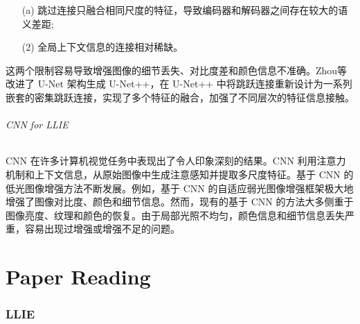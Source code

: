 \documentclass[a4paper, 10pt]{article}
\begin{document}
		\begin{itemize}
			\item[(a)] 
			跳过连接只融合相同尺度的特征，导致编码器和解码器之间存在较大的语义差距;
			
			\item[(2)]
			全局上下文信息的连接相对稀缺。
		\end{itemize}	
		
		这两个限制容易导致增强图像的细节丢失、对比度差和颜色信息不准确。Zhou等\cite{zhou2018unet++,zhou2019unet++}改进了 U-Net 架构生成 U-Net++，在 U-Net++ 中将跳跃连接重新设计为一系列嵌套的密集跳跃连接，实现了多个特征的融合，加强了不同层次的特征信息接触。

		\paragraph{CNN for LLIE}
		
		CNN 在许多计算机视觉任务中表现出了令人印象深刻的结果。CNN 利用注意力机制\cite{yang2021locally, zhang2020attention}和上下文信息，从原始图像中生成注意感知并提取多尺度特征\cite{li2018multi,zamir2020learning}。基于 CNN 的低光图像增强方法不断发展。例如，基于 CNN 的自适应弱光图像增强框架\cite{li2020visual}极大地增强了图像对比度、颜色和细节信息。然而，现有的基于 CNN 的方法大多侧重于图像亮度、纹理和颜色的恢复\cite{xu2020learning}。由于局部光照不均匀，颜色信息和细节信息丢失严重，容易出现过增强或增强不足的问题。
		

	
	\part{Paper Reading}
	
	\section{LLIE}
		
\end{document}
